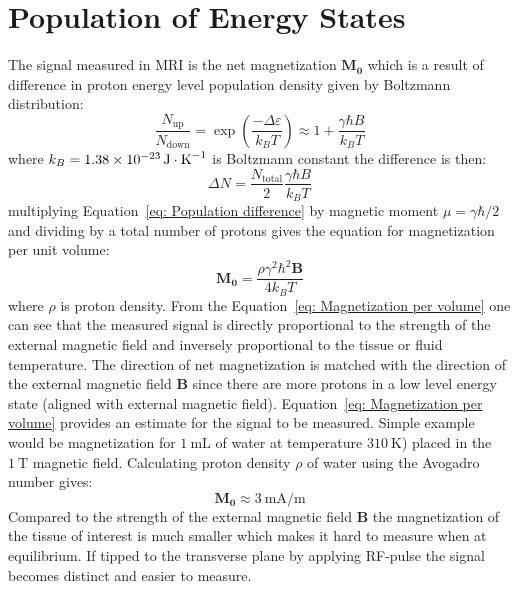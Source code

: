 \section{Population of Energy States}
The signal measured in MRI is the net magnetization $\mathbf{M_{0}}$ which is a result of difference in proton energy level population density given by Boltzmann distribution:
\begin{equation}\label{eq: Boltzmann distribution}
	\frac{N_{\mathrm{up}}}{N_{\mathrm{down}}}=\exp\left(\frac{-\Delta\varepsilon}{k_{B}T}\right)\approx 1 + \frac{{\gamma\hbar B}}{k_{B}T}
\end{equation}
where $k_{B} = \SI{1.38e-23}{\joule \cdot {\kelvin}^{-1}}$ is Boltzmann constant the difference is then:
\begin{equation} \label{eq: Population difference}
	\Delta N = \frac{N_{\mathrm{total}}}{2}\frac{\gamma\hbar B}{k_{B}T}
\end{equation}
multiplying Equation~\ref{eq: Population difference} by magnetic moment $\mu = \gamma \hbar / 2$ and dividing by a total number of protons gives the equation for magnetization per unit volume:
\begin{equation}\label{eq: Magnetization per volume}
	\mathbf{M_{0}}=\frac{\rho\gamma^2\hbar^2\mathbf{B}}{4k_{B}T}
\end{equation}
where $\rho$ is proton density. 
From the Equation~\ref{eq: Magnetization per volume} one can see that the measured signal is directly proportional to the strength of the external magnetic field and inversely proportional to the tissue or fluid temperature. 
The direction of net magnetization is matched with the direction of the external magnetic field $\mathbf{B}$ since there are more protons in a low level energy state (aligned with external magnetic field). 
Equation~\ref{eq: Magnetization per volume} provides an estimate for the signal to be measured. 
Simple example would be magnetization for $\SI{1}{\milli\liter}$ of water at temperature $\SI{310}{\kelvin}$) placed in the $\SI{1}{\tesla}$ magnetic field. 
Calculating proton density $\rho$ of water using the Avogadro number gives:
\begin{equation}\label{eq: Magnetization estimation}
	\mathbf{M_{0}}\approx \SI{3}{\milli\ampere / \meter} 
\end{equation}
Compared to the strength of the external magnetic field $\mathbf{B}$ the magnetization of the tissue of interest is much smaller which makes it hard to measure when at equilibrium. 
If tipped to the transverse plane by applying RF-pulse the signal becomes distinct and easier to measure.
